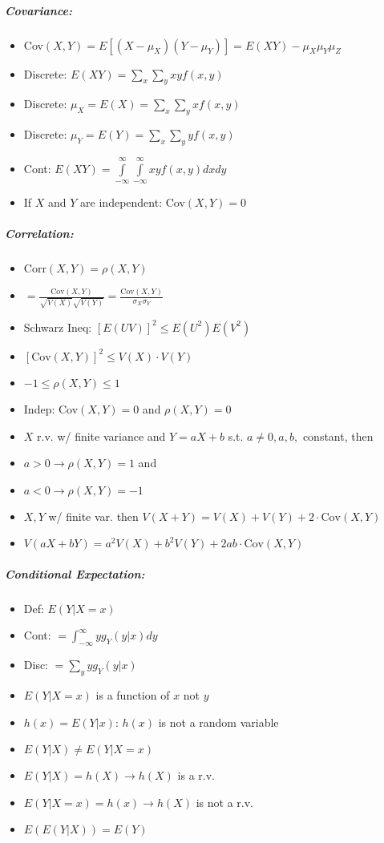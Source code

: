 \documentclass[landscape,10pt]{article}
\begin{document}
\begin{multicols}{4}
\subparagraph*{Covariance: }
\begin{itemize}
    \item[] Cov\((X,Y) = E[(X-\mu_X)(Y-\mu_Y)] = E(XY) - \mu_X \mu_Y \mu_Z\)
    \item[] Discrete: \(E(XY) = \sum\limits_x\sum\limits_yxyf(x,y)\)
    \item[] Discrete: \(\mu_X = E(X) = \sum\limits_x\sum\limits_yxf(x,y)\)
    \item[] Discrete: \(\mu_Y = E(Y) = \sum\limits_x\sum\limits_yyf(x,y)\)
    \item[] Cont: \(E(XY) = \int\limits_{-\infty}^{\infty}\int\limits_{-\infty}^{\infty}{xyf(x,y)dxdy}\)
    \item[] If \(X\) and \(Y\) are independent: Cov\((X,Y) = 0\)
\end{itemize}
\subparagraph*{Correlation: }
\begin{itemize}
    \item[] Corr\((X,Y) = \rho(X,Y)\)
    \item[] \(= \frac{\text{Cov}(X,Y)}{\sqrt{V(X)}\sqrt{V(Y)}} =\frac{\text{Cov}(X,Y)}{\sigma_X \sigma_Y}\)
    \item[] Schwarz Ineq: \([E(UV)]^2 \leq E(U^2)E(V^2)\)
    \item[] \([\text{Cov}(X,Y)]^2 \leq V(X) \cdot V(Y)\)
    \item[] \( -1 \leq \rho(X,Y) \leq 1\)
    \item[] Indep: Cov\((X,Y) = 0\) and \(\rho(X,Y) = 0\)
    \item[] \(X\) r.v. w/ finite variance and \(Y = aX+b\) s.t. \(a \neq 0, a,b,\) constant, then
    \item[] \(a > 0 \rightarrow \rho(X,Y) = 1\) and
    \item[] \(a < 0 \rightarrow \rho(X,Y) = -1\)
    \item[] \(X,Y\) w/ finite var. then \(V(X+Y) = V(X)+V(Y) + 2\cdot \text{Cov}(X,Y)\)
    \item[] \(V(aX + bY) = a^2 V(X) + b^2 V(Y) + 2ab\cdot\text{Cov}(X,Y)\)
\end{itemize}

\subparagraph*{Conditional Expectation:}
\begin{itemize}
    \item[] Def: \(E(Y|X=x)\)
    \item[] Cont: \(= \int_{-\infty}^{\infty}{y g_Y(y|x)dy}\)
    \item[] Disc: \(= \sum_{y}{y g_Y(y|x)}\)
    \item[] \(E(Y|X=x)\) is a function of \(x\) not \(y\)
    \item[] \(h(x) = E(Y|x)\): \(h(x)\) is not a random variable
    \item[] \(E(Y|X) \neq E(Y|X=x)\)
    \item[] \(E(Y|X) = h(X) \rightarrow h(X)\) is a r.v.
    \item[] \(E(Y|X=x) = h(x) \rightarrow h(X)\) is not a r.v.
    \item[] \(E(E(Y|X)) = E(Y)\)
\end{itemize}


\end{multicols}
\end{document}

